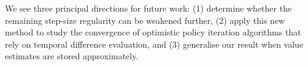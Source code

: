 \documentclass[twoside,11pt]{article}
\DeclareRobustCommand{\reviewbarstart}{%
  \ifhmode %
    \vadjust{\vbox to 0pt{%
      \vskip-\ht\strutbox %
      \vskip-\dp\strutbox %
      \cbstart[\changebarwidth] %
      \vss %
    }}%
  \else %
    \cbstart[\changebarwidth]%
  \fi %
} %
\providecommand{\DIFadd}[1]{#1} %
\providecommand{\DIFaddbegin}{\reviewbarstart} %
\providecommand{\DIFaddend}{\protect\cbend} %
\def\DIFadd#1{#1}%
\def\DIFaddbegin{}%
\def\DIFaddend{}%
\begin{document}
We see three principal directions for future work:
(1)  \DIFaddbegin \DIFadd{determine whether the remaining step-size regularity can be weakened further}\DIFaddend ,
(2) apply this new method to study the convergence of optimistic policy iteration algorithms that rely on temporal difference evaluation,
and (3) generalise our result when value estimates are stored approximately.










\end{document}
